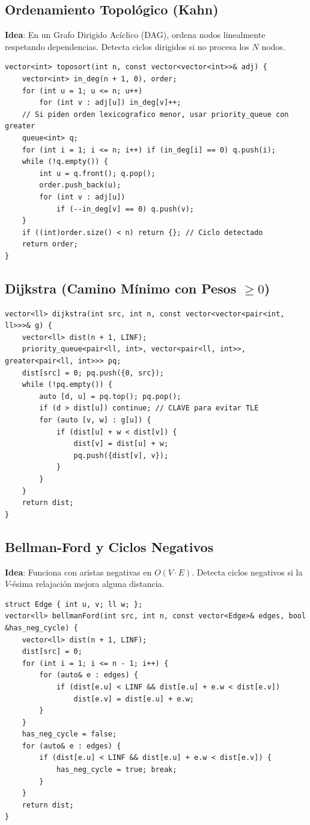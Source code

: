 \documentclass[9pt,twocolumn,a4paper]{extarticle}
\begin{document}
\subsection{Ordenamiento Topológico (Kahn)}
\textbf{Idea}: En un Grafo Dirigido Acíclico (DAG), ordena nodos linealmente respetando dependencias. Detecta ciclos dirigidos si no procesa los $N$ nodos.
\begin{lstlisting}
vector<int> toposort(int n, const vector<vector<int>>& adj) {
    vector<int> in_deg(n + 1, 0), order;
    for (int u = 1; u <= n; u++)
        for (int v : adj[u]) in_deg[v]++;
    // Si piden orden lexicografico menor, usar priority_queue con greater
    queue<int> q;
    for (int i = 1; i <= n; i++) if (in_deg[i] == 0) q.push(i);
    while (!q.empty()) {
        int u = q.front(); q.pop();
        order.push_back(u);
        for (int v : adj[u])
            if (--in_deg[v] == 0) q.push(v);
    }
    if ((int)order.size() < n) return {}; // Ciclo detectado
    return order;
}
\end{lstlisting}

\subsection{Dijkstra (Camino Mínimo con Pesos $\ge 0$)}
\begin{lstlisting}
vector<ll> dijkstra(int src, int n, const vector<vector<pair<int, ll>>>& g) {
    vector<ll> dist(n + 1, LINF);
    priority_queue<pair<ll, int>, vector<pair<ll, int>>, greater<pair<ll, int>>> pq;
    dist[src] = 0; pq.push({0, src});
    while (!pq.empty()) {
        auto [d, u] = pq.top(); pq.pop();
        if (d > dist[u]) continue; // CLAVE para evitar TLE
        for (auto [v, w] : g[u]) {
            if (dist[u] + w < dist[v]) {
                dist[v] = dist[u] + w;
                pq.push({dist[v], v});
            }
        }
    }
    return dist;
}
\end{lstlisting}

\subsection{Bellman-Ford y Ciclos Negativos}
\textbf{Idea}: Funciona con aristas negativas en $O(V \cdot E)$. Detecta ciclos negativos si la $V$-ésima relajación mejora alguna distancia.
\begin{lstlisting}
struct Edge { int u, v; ll w; };
vector<ll> bellmanFord(int src, int n, const vector<Edge>& edges, bool &has_neg_cycle) {
    vector<ll> dist(n + 1, LINF);
    dist[src] = 0;
    for (int i = 1; i <= n - 1; i++) {
        for (auto& e : edges) {
            if (dist[e.u] < LINF && dist[e.u] + e.w < dist[e.v])
                dist[e.v] = dist[e.u] + e.w;
        }
    }
    has_neg_cycle = false;
    for (auto& e : edges) {
        if (dist[e.u] < LINF && dist[e.u] + e.w < dist[e.v]) {
            has_neg_cycle = true; break;
        }
    }
    return dist;
}
\end{lstlisting}
\end{document}
